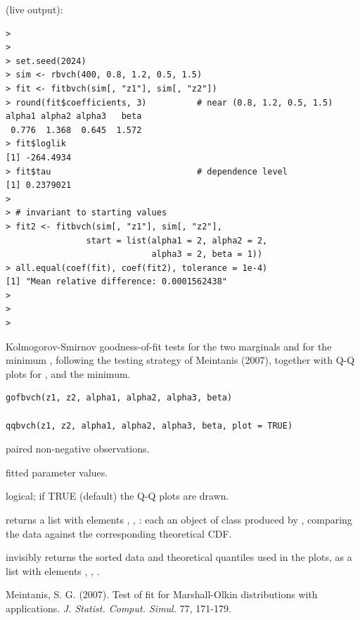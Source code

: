 \documentclass[11pt,a4paper]{article}
\begin{document}
\vspace{0.8em}
 (live output):
\begin{lstlisting}
> 
> 
> set.seed(2024)
> sim <- rbvch(400, 0.8, 1.2, 0.5, 1.5)
> fit <- fitbvch(sim[, "z1"], sim[, "z2"])
> round(fit$coefficients, 3)          # near (0.8, 1.2, 0.5, 1.5)
alpha1 alpha2 alpha3   beta 
 0.776  1.368  0.645  1.572 
> fit$loglik
[1] -264.4934
> fit$tau                             # dependence level
[1] 0.2379021
> 
> # invariant to starting values
> fit2 <- fitbvch(sim[, "z1"], sim[, "z2"],
                start = list(alpha1 = 2, alpha2 = 2,
                             alpha3 = 2, beta = 1))
> all.equal(coef(fit), coef(fit2), tolerance = 1e-4)
[1] "Mean relative difference: 0.0001562438"
> 
> 
> 
\end{lstlisting}


\newpage

%
\begin{Description}
Kolmogorov-Smirnov goodness-of-fit tests for the two
marginals and for the minimum , following the
testing strategy of Meintanis (2007), together with Q-Q plots for
,  and the minimum.
\end{Description}
%
\begin{Usage}
\begin{verbatim}
gofbvch(z1, z2, alpha1, alpha2, alpha3, beta)

qqbvch(z1, z2, alpha1, alpha2, alpha3, beta, plot = TRUE)
\end{verbatim}
\end{Usage}
%
\begin{Arguments}
\begin{ldescription}
\item[\code{z1}, \code{z2}] paired non-negative observations.

\item[\code{alpha1}, \code{alpha2}, \code{alpha3}, \code{beta}] fitted parameter values.

\item[\code{plot}] logical; if TRUE (default) the Q-Q plots are drawn.
\end{ldescription}
\end{Arguments}
%
\begin{Value}
 returns a list with elements
, , : each an object of
class  produced by ,
comparing the data against the corresponding theoretical CDF.

 invisibly returns the sorted data and theoretical
quantiles used in the plots, as a list with elements
, , .
\end{Value}
%
\begin{References}
Meintanis, S. G. (2007). Test of fit for
Marshall-Olkin distributions with applications.
\emph{J. Statist. Comput. Simul.} 77, 171-179.
\end{References}
\end{document}

